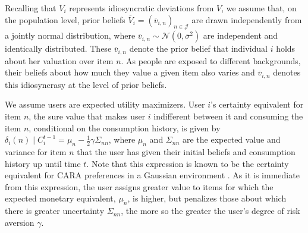 \documentclass[manuscript, nonacm]{acmart}
\begin{document}
\par
Recalling that $V_i$ represents idiosyncratic deviations from $V$, we assume that, on the population level, prior beliefs $\overline V_i=\left(\overline v_{i,n}\right)_{n \in \mathcal{J}}$ are drawn independently from a jointly normal distribution, where $\overline v_{i,n} \sim \mathcal N (0, \overline \sigma^2)$ are independent and identically distributed. These $\overline v_{i,n}$ denote the prior belief that individual $i$ holds about her valuation over item $n$. As people are exposed to different backgrounds, their beliefs about how much they value a given item also varies and $\overline v_{i,n}$ denotes this idiosyncrasy at the level of prior beliefs.
\par

We assume users are expected utility maximizers. User $i$'s certainty equivalent for item $n$, the sure value that makes user $i$ indifferent between it and consuming the item $n$, conditional on the consumption history, is given by
$\delta_{i}(n)\mid C_i^{t-1}=\mu_n-\frac{1}{2}\gamma \Sigma_{nn}$, where $\mu_n$ and $\Sigma_{nn}$ are the expected value and variance for item $n$ that the user has given their initial beliefs and consumption history up until time $t$. Note that this expression is known to be the certainty equivalent for CARA preferences in a Gaussian environment \cite{mas1995microeconomic}. As it is immediate from this expression, the user assigns greater value to items for which the expected monetary equivalent, $\mu_n$, is higher, but penalizes those about which there is greater uncertainty $\Sigma_{nn}$, the more so the greater the user's degree of risk aversion $\gamma$.
\end{document}
